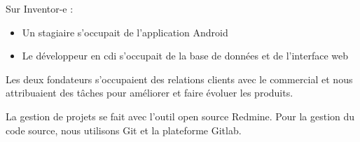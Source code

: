 Sur Inventor-e : 
\begin{itemize}
  \item[\textbullet] Un stagiaire s'occupait de l'application Android
  \item[\textbullet] Le développeur en cdi s'occupait de la base de données et de l'interface web
\end{itemize}

Les deux fondateurs s'occupaient des relations clients avec le commercial et nous attribuaient des tâches pour améliorer et faire évoluer les produits.

La gestion de projets se fait avec l'outil open source Redmine. Pour la gestion du code source, nous utilisons Git et la plateforme Gitlab.


